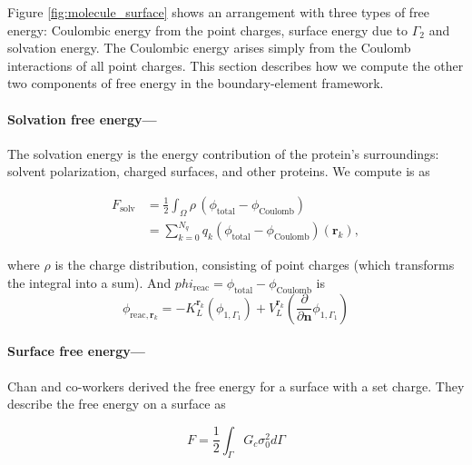 
Figure \ref{fig:molecule_surface} shows an arrangement with three types of free energy: Coulombic energy from the point charges, surface energy due to $\Gamma_2$ and solvation energy. The Coulombic energy arises simply from the Coulomb interactions of all point charges. This section describes how we compute the other two components of free energy in the boundary-element framework.

\medskip

\paragraph*{Solvation free energy---}

The solvation energy is the energy contribution of the protein's surroundings: solvent polarization, charged surfaces, and other proteins. We compute is as

\begin{align} \label{eq:solv_energy}
F_{\text{solv}} &= \frac{1}{2} \int_{\Omega} \rho \,(\phi_{\text{total}} - \phi_{\text{Coulomb}}) \\
&= \sum_{k=0}^{N_q} q_k (\phi_{\text{total}} - \phi_{\text{Coulomb}})(\mathbf{r}_k),
\end{align}

\noindent where $\rho$ is the charge distribution, consisting of point charges (which transforms the integral into a sum). And $phi_\text{reac} = \phi_{\text{total}} - \phi_{\text{Coulomb}}$ is
%
\begin{equation} \label{eq:phi_reac_bem}
\phi_{\text{reac},\mathbf{r}_k} = -K_{L}^{\mathbf{r}_k}(\phi_{1,\Gamma_1}) + V_{L}^{\mathbf{r}_k} \left(\frac{\partial}{\partial \mathbf{n}}\phi_{1,\Gamma_1} \right) 
\end{equation}

\paragraph*{Surface free energy---}

Chan and co-workers \cite{ChanMitchell1983,CarnieChan1993} derived the free energy for a surface with a set charge. They describe the free energy on a surface as

\begin{equation} \label{eq:energy_surf}
F = \frac{1}{2} \int_{\Gamma} G_c \sigma_0^2 d\Gamma 
\end{equation} 
